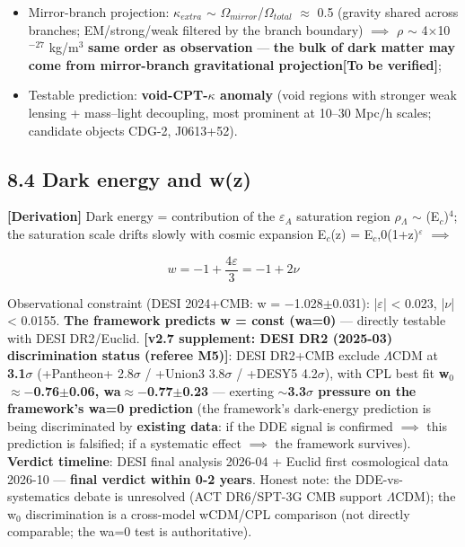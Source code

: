 \documentclass[12pt]{article}
\newcommand{\mtag}[1]{\textbf{[#1]}}
\newcommand{\up}[1]{\ensuremath{^{#1}}}
\newcommand{\down}[1]{\ensuremath{_{#1}}}
\begin{document}
\begin{itemize}
\item Mirror-branch projection: \ensuremath{\kappa}\down{extra} \ensuremath{\sim} \ensuremath{\Omega}\down{mirror}/\ensuremath{\Omega}\down{total} \ensuremath{\approx} 0.5 (gravity shared across branches; EM/strong/weak filtered by the branch boundary) \ensuremath{\implies} \ensuremath{\rho} \ensuremath{\sim} 4\ensuremath{\times}10\up{-27} kg/m\up{3} \textbf{same order as observation} --- \textbf{the bulk of dark matter may come from mirror-branch gravitational projection}\mtag{To be verified};
\item Testable prediction: \textbf{void-CPT-\ensuremath{\kappa} anomaly} (void regions with stronger weak lensing + mass--light decoupling, most prominent at 10--30 Mpc/h scales; candidate objects CDG-2, J0613+52).
\end{itemize}

\subsection{8.4 Dark energy and w(z)}

\mtag{Derivation} Dark energy = contribution of the \ensuremath{\varepsilon}\down{A} saturation region \ensuremath{\rho}\down{\Lambda{}} \ensuremath{\sim} (E\down{c})\up{4}; the saturation scale drifts slowly with cosmic expansion E\down{c}(z) = E\down{c},0(1+z)\up{\varepsilon{}} \ensuremath{\implies}

\[w = -1 + \frac{4\varepsilon}{3} = -1 + 2\nu\]

Observational constraint (DESI 2024+CMB: w = \ensuremath{-}1.028\ensuremath{\pm}0.031): |\ensuremath{\varepsilon}| < 0.023, |\ensuremath{\nu}| < 0.0155. \textbf{The framework predicts w = const (wa=0)} --- directly testable with DESI DR2/Euclid. \textbf{\mtag{v2.7 supplement: DESI DR2 (2025-03) discrimination status (referee M5)}}: DESI DR2+CMB exclude \ensuremath{\Lambda}CDM at \textbf{3.1\ensuremath{\sigma}} (+Pantheon+ 2.8\ensuremath{\sigma} / +Union3 3.8\ensuremath{\sigma} / +DESY5 4.2\ensuremath{\sigma}), with CPL best fit \textbf{w\down{0}\ensuremath{\approx}\ensuremath{-}0.76\ensuremath{\pm}0.06, wa\ensuremath{\approx}\ensuremath{-}0.77\ensuremath{\pm}0.23} --- exerting \textbf{\ensuremath{\sim}3.3\ensuremath{\sigma} pressure on the framework's wa=0 prediction} (the framework's dark-energy prediction is being discriminated by \textbf{existing data}: if the DDE signal is confirmed \ensuremath{\implies} this prediction is falsified; if a systematic effect \ensuremath{\implies} the framework survives). \textbf{Verdict timeline}: DESI final analysis 2026-04 + Euclid first cosmological data 2026-10 --- \textbf{final verdict within 0-2 years}. Honest note: the DDE-vs-systematics debate is unresolved (ACT DR6/SPT-3G CMB support \ensuremath{\Lambda}CDM); the w\down{0} discrimination is a cross-model wCDM/CPL comparison (not directly comparable; the wa=0 test is authoritative).
\end{document}
